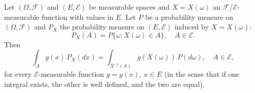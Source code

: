 Let $(\Omega, \mathcal{F})$ and $(E, \mathcal{E})$ be measurable spaces and $X = X(\omega)$ an $\mathcal{F}/\mathcal{E}$-measurable function with values in $E$. Let $P$ be a probability measure on $(\Omega, \mathcal{F})$ and $P_X$ the probability measure on $(E, \mathcal{E})$ induced by $X = X(\omega)$:
$$P_X(A) = P\{\omega : X(\omega) \in A\}, \quad A \in \mathcal{E}.$$
Then
$$\int_A g(x) \, P_X(dx) = \int_{X^{-1}(A)} g(X(\omega)) \, P(d\omega), \quad A \in \mathcal{E},$$
for every $\mathcal{E}$-measurable function $g = g(x)$, $x \in E$ (in the sense that if one integral exists, the other is well defined, and the two are equal).
